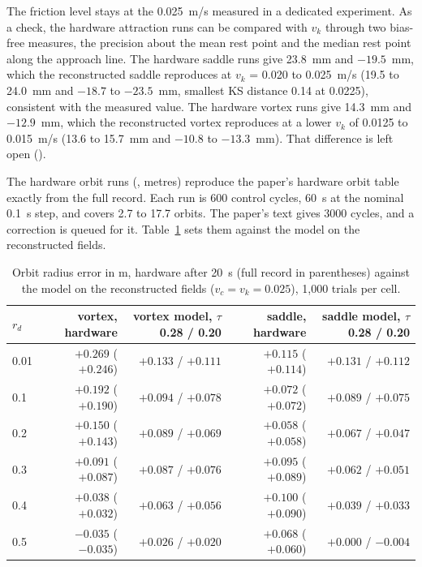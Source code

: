 \documentclass[10pt,letterpaper]{article}
\begin{document}
The friction level stays at the 0.025~m/s measured in a dedicated experiment. As a check, the hardware attraction runs can be compared with $v_k$ through two bias-free measures, the precision about the mean rest point and the median rest point along the approach line. The hardware saddle runs give 23.8~mm and $-19.5$~mm, which the reconstructed saddle reproduces at $v_k$ = 0.020 to 0.025~m/s (19.5 to 24.0~mm and $-18.7$ to $-23.5$~mm, smallest KS distance 0.14 at 0.0225), consistent with the measured value. The hardware vortex runs give 14.3~mm and $-12.9$~mm, which the reconstructed vortex reproduces at a lower $v_k$ of 0.0125 to 0.015~m/s (13.6 to 15.7~mm and $-10.8$ to $-13.3$~mm). That difference is left open ().

The hardware orbit runs (, metres) reproduce the paper's hardware orbit table exactly from the full record. Each run is 600 control cycles, 60~s at the nominal 0.1~s step, and covers 2.7 to 17.7 orbits. The paper's text gives 3000 cycles, and a correction is queued for it. Table~\ref{tab:hworbit} sets them against the model on the reconstructed fields.

\begin{table}[htbp]
\centering\small
\caption{Orbit radius error in m, hardware after 20~s (full record in parentheses) against the model on the reconstructed fields ($v_c = v_k = 0.025$), 1,000 trials per cell.}
\label{tab:hworbit}
\begin{tabular}{@{}l rr rr@{}}
\toprule
$r_d$ & vortex, hardware & vortex model, $\tau$ 0.28 / 0.20 & saddle, hardware & saddle model, $\tau$ 0.28 / 0.20 \\
\midrule
0.01 & $+0.269$ ($+0.246$) & $+0.133$ / $+0.111$ & $+0.115$ ($+0.114$) & $+0.131$ / $+0.112$ \\
0.1 & $+0.192$ ($+0.190$) & $+0.094$ / $+0.078$ & $+0.072$ ($+0.072$) & $+0.089$ / $+0.075$ \\
0.2 & $+0.150$ ($+0.143$) & $+0.089$ / $+0.069$ & $+0.058$ ($+0.058$) & $+0.067$ / $+0.047$ \\
0.3 & $+0.091$ ($+0.087$) & $+0.087$ / $+0.076$ & $+0.095$ ($+0.089$) & $+0.062$ / $+0.051$ \\
0.4 & $+0.038$ ($+0.032$) & $+0.063$ / $+0.056$ & $+0.100$ ($+0.090$) & $+0.039$ / $+0.033$ \\
0.5 & $-0.035$ ($-0.035$) & $+0.026$ / $+0.020$ & $+0.068$ ($+0.060$) & $+0.000$ / $-0.004$ \\
\bottomrule
\end{tabular}
\end{table}
\end{document}
